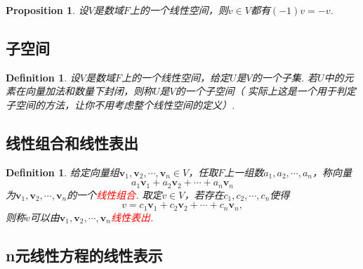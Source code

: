 \documentclass{article}
\newtheorem{proposition}[theorem]{Proposition}
\newtheorem{definition}[theorem]{Definition}
\newcommand{\mbf}[1]{\bm{#1}}
\newcommand{\redt}[1]{\textcolor{red}{#1}}
\begin{document}
\begin{proposition}
\rm 设$V$是数域$F$上的一个线性空间，则$v \in V$都有$(-1)v=-v$.
\end{proposition}

\subsection{子空间}

\begin{definition}
\rm 设$V$是数域$F$上的一个线性空间，给定$U$是$V$的一个子集. 若$U$中的元素在向量加法和数量下封闭，则称$U$是$V$的一个子空间（{\color{blue} 实际上这是一个用于判定子空间的方法，让你不用考虑整个线性空间的定义}）.
\end{definition}

\subsection{线性组合和线性表出}

\begin{definition}
\rm 给定向量组$\mbf{v}_1,\mbf{v}_2,\cdots,\mbf{v}_n \in V$，任取$F$上一组数$a_1,a_2,\cdots,a_n$，称向量
$$
a_1\mbf{v}_1 + a_2\mbf{v}_2 + \cdots + a_n\mbf{v}_n
$$
为$\mbf{v}_1,\mbf{v}_2,\cdots,\mbf{v}_n$的一个\redt{线性组合}. 取定$v \in V$，若存在$c_1,c_2,\cdots,c_n$使得
$$
v = c_1\mbf{v}_1 + c_2\mbf{v}_2 + \cdots + c_n\mbf{v}_n,
$$
则称$v$可以由$\mbf{v}_1,\mbf{v}_2,\cdots,\mbf{v}_n$\redt{线性表出}. 
\end{definition}

\subsection{n元线性方程的线性表示}
\end{document}
